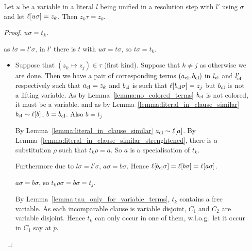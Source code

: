 \documentclass[,%
	paper=a4,%
	DIV12, %
	twoside=false,%
	liststotoc,
	bibtotoc,
	draft=false,%
	numbers=noendperiod
]{scrartcl}
\begin{document}
\cbstart
\begin{lemma}
	\label{lemma:just_introduced_lifting_vars_not_affected_by_tau}
	Let $u$ be a variable in a literal $l$ being unified in a resolution step with $l'$ using $\sigma$ and let $\ell[u\sigma] = z_k$.
	Then $z_k\tau = z_k$.
\end{lemma}
\begin{proof}



	$u\sigma = t_k$.

	as $l\sigma = l'\sigma$, in $l'$ there is $t$ with $u\sigma = t\sigma$, so $t\sigma = t_k$.


	\begin{itemize}
			\item
				Suppose that $(z_k\mapsto z_j) \in \tau$ (first kind). Suppose that $k\neq j$ as otherwise we are done.
				Then we have a pair of corresponding terms $(a_\mathrm{cl}, b_\mathrm{cl})$ in $l_\mathrm{cl}$ and $l_\mathrm{cl}'$ respectively such that  
				$a_\mathrm{cl} = z_k$ and $b_\mathrm{cl}$ is such that $\ell[b_\mathrm{cl}\sigma] = z_j$ but $b_\mathrm{cl}$ is not a lifting variable. As by Lemma~\ref{lemma:no_colored_terms} $b_\mathrm{cl}$ is not colored, it must be a variable.
				and as by Lemma~\ref{lemma:literal_in_clause_similar} $b_\mathrm{cl} \sim \ell[b]$, $b = b_\mathrm{cl}$.
				Also $b = t_j$

				By Lemma~\ref{lemma:literal_in_clause_similar} $a_\mathrm{cl} \sim \ell[a]$. 
				By Lemma~\ref{lemma:literal_in_clause_similar_strenghtened}, there is a substitution $\rho$ such that $t_k\rho = a$.
				So $a$ is a specialisation of $t_k$.

				Furthermore due to $l\sigma = l'\sigma$, $a\sigma = b\sigma$.
				Hence $\ell[b_\mathrm{cl}\sigma] = \ell[b\sigma] = \ell[a\sigma]$.

				$a\sigma = b\sigma$, so $t_k\rho\sigma = b\sigma = t_j$. 
				

				\bigskip


				By Lemma~\ref{lemma:tau_only_for_variable_terms}, $t_k$ contains a free variable.
				As each incomparable clause is variable disjoint, $C_1$ and $C_2$ are variable disjoint.
				Hence $t_k$ can only occur in one of them, w.l.o.g.\ let it occur in $C_1$ say at $p$.


\end{itemize}
\end{proof}
\end{document}
